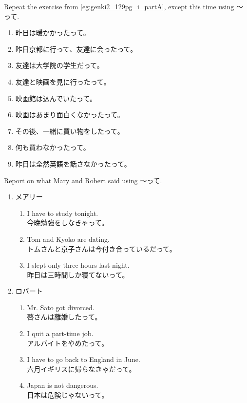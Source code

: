 \documentclass[notoc,notitlepage]{tufte-book}
\begin{document}
\begin{ex}
  Repeat the exercise from \cref{eg:genki2_129pg_i_partA}, except this time using 〜って.
  \begin{enumerate}
    \item 昨日は暖かかったって。
    \item 昨日京都に行って、友達に会ったって。
    \item 友達は大学院の学生だって。
    \item 友達と映画を見に行ったって。
    \item 映画館は込んでいたって。
    \item 映画はあまり面白くなかったって。
    \item その後、一緒に買い物をしたって。
    \item 何も買わなかったって。
    \item 昨日は全然英語を話さなかったって。
  \end{enumerate}
\end{ex}

\begin{ex}
  Report on what Mary and Robert said using 〜って.
  \begin{enumerate}
    \item メアリー
      \begin{enumerate}
        \item I have to study tonight. \\
          今晩勉強をしなきゃって。
        \item Tom and Kyoko are dating. \\
          トムさんと京子さんは今付き合っているだって。
        \item I slept only three hours last night. \\
          昨日は三時間しか寝てないって。
      \end{enumerate}
    \item ロバート
      \begin{enumerate}
        \item Mr. Sato got divorced. \\
          啓さんは離婚したって。
        \item I quit a part-time job. \\
          アルバイトをやめたって。
        \item I have to go back to England in June. \\
          六月イギリスに帰らなきゃだって。
        \item Japan is not dangerous. \\
          日本は危険じゃないって。
      \end{enumerate}
  \end{enumerate}
\end{ex}
\end{document}

